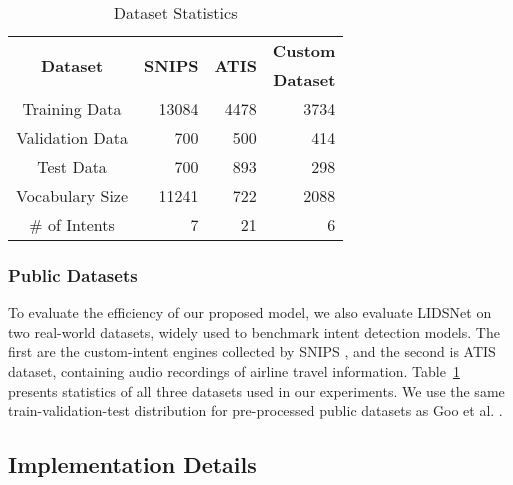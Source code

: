\documentclass[conference]{IEEEtran}
\newcommand\Tstrut{\rule{0pt}{2.6ex}}
\newcommand\Bstrut{\rule[-0.9ex]{0pt}{0pt}}
\begin{document}
\begin{table}[b]
	\caption{Dataset Statistics}
	\centering
	\begin{tabular}{c r r r}
		\toprule
		\multirow{2}{*}{\textbf{Dataset}} & \multirow{2}{*}{\textbf{SNIPS}} & \multirow{2}{*}{\textbf{ATIS}} & \textbf{Custom}                \\
		&                                 &                                & \textbf{Dataset}               \\ \midrule
		Training Data           & 13084                           & 4478                           & 3734                           \\
		Validation Data          & 700                             & 500                            & 414             \Tstrut        \\
		Test Data             & 700                             & 893                            & 298             \Tstrut        \\
		Vocabulary Size          & 11241                           & 722                            & 2088            \Tstrut        \\
		\# of Intents           & 7                               & 21                             & 6               \Tstrut\Bstrut \\ \bottomrule
	\end{tabular}
	\label{tab:datasetStatistics}
\end{table}

\subsubsection{Public Datasets}\label{sec:publicDatasets}

To evaluate the efficiency of our proposed model, we also evaluate LIDSNet on two real-world datasets, widely used to benchmark intent detection models. The first are the custom-intent engines collected by SNIPS \cite{coucke2018snips}, and the second is ATIS \cite{price-1990-evaluation} dataset, containing audio recordings of airline travel information. Table~\ref{tab:datasetStatistics} presents statistics of all three datasets used in our experiments. We use the same train-validation-test distribution for pre-processed public datasets as Goo et al. \cite{goo-etal-2018-slot}.

\subsection{Implementation Details}\label{sec:implementationDetails}
\end{document}
